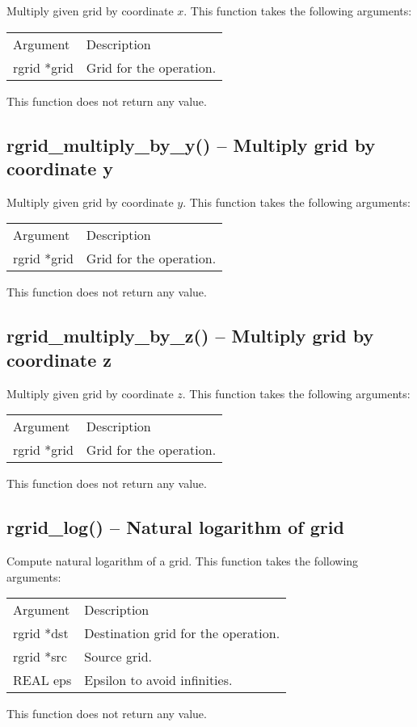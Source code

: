 \documentclass[12pt,letterpaper]{report}
\begin{document}
Multiply given grid by coordinate $x$. This function takes the following arguments:
\begin{longtable}{p{} p{}}
Argument & Description\\
\cline{1-2}
rgrid *grid & Grid for the operation.\\
\end{longtable}
\noindent
This function does not return any value.\\

\subsection{rgrid\_multiply\_by\_y() -- Multiply grid by coordinate y}

Multiply given grid by coordinate $y$. This function takes the following arguments:
\begin{longtable}{p{} p{}}
Argument & Description\\
\cline{1-2}
rgrid *grid & Grid for the operation.\\
\end{longtable}
\noindent
This function does not return any value.\\

\subsection{rgrid\_multiply\_by\_z() -- Multiply grid by coordinate z}

Multiply given grid by coordinate $z$. This function takes the following arguments:
\begin{longtable}{p{} p{}}
Argument & Description\\
\cline{1-2}
rgrid *grid & Grid for the operation.\\
\end{longtable}
\noindent
This function does not return any value.\\

\subsection{rgrid\_log() -- Natural logarithm of grid}

Compute natural logarithm of a grid. This function takes the following arguments:
\begin{longtable}{p{} p{}}
Argument & Description\\
\cline{1-2}
rgrid *dst & Destination grid for the operation.\\
rgrid *src & Source grid.\\
REAL eps & Epsilon to avoid infinities.\\
\end{longtable}
\noindent
This function does not return any value.\\
\end{document}
